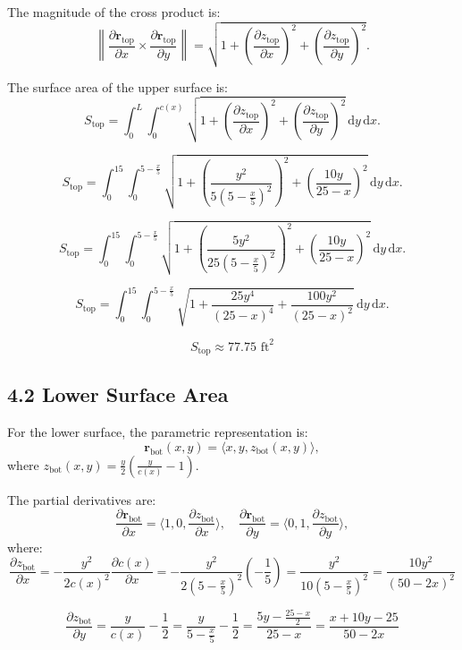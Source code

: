 \documentclass[12pt]{article}
\begin{document}
The magnitude of the cross product is:
\[
\left\| \frac{\partial \mathbf{r}_{\text{top}}}{\partial x} \times \frac{\partial \mathbf{r}_{\text{top}}}{\partial y} \right\| =
\sqrt{1 + \left( \frac{\partial z_{\text{top}}}{\partial x} \right)^2 + \left( \frac{\partial z_{\text{top}}}{\partial y} \right)^2}.
\]

The surface area of the upper surface is:
\[
S_{\text{top}} = \int_{0}^L \int_{0}^{c(x)} \sqrt{1 + \left( \frac{\partial z_{\text{top}}}{\partial x} \right)^2 + \left( \frac{\partial z_{\text{top}}}{\partial y} \right)^2} \, \mathrm{d}y \, \mathrm{d}x.
\]

\[
S_{\text{top}} = \int_{0}^{15} \int_{0}^{5 - \frac{x}{5}} \sqrt{1 + \left( \frac{y^2}{5(5 - \frac{x}{5})^2} \right)^2 + \left( \frac{10y}{25 - x} \right)^2} \, \mathrm{d}y \, \mathrm{d}x.
\]

\[
S_{\text{top}} = \int_{0}^{15} \int_{0}^{5 - \frac{x}{5}} \sqrt{1 + \left( \frac{5y^2}{25(5 - \frac{x}{5})^2} \right)^2 + \left( \frac{10y}{25 - x} \right)^2} \, \mathrm{d}y \, \mathrm{d}x.
\]

\[
S_{\text{top}} = \int_{0}^{15} \int_{0}^{5 - \frac{x}{5}} \sqrt{1 + \frac{25y^4}{(25 - x)^4} +  \frac{100y^2}{(25 - x)^2}} \, \mathrm{d}y \, \mathrm{d}x.
\]

\[S_{\text{top}} \approx 77.75 \text{ ft}^2\]

\subsection*{4.2 Lower Surface Area}

For the lower surface, the parametric representation is:
\[
\mathbf{r}_{\text{bot}}(x, y) = \langle x, y, z_{\text{bot}}(x, y) \rangle,
\]
where \( z_{\text{bot}}(x, y) = \frac{y}{2} \left( \frac{y}{c(x)} - 1 \right) \).

The partial derivatives are:
\[
\frac{\partial \mathbf{r}_{\text{bot}}}{\partial x} = \langle 1, 0, \frac{\partial z_{\text{bot}}}{\partial x} \rangle, \quad
\frac{\partial \mathbf{r}_{\text{bot}}}{\partial y} = \langle 0, 1, \frac{\partial z_{\text{bot}}}{\partial y} \rangle,
\]
where:
\[
\frac{\partial z_{\text{bot}}}{\partial x} = -\frac{y^2}{2c(x)^2} \frac{\partial c(x)}{\partial x} = -\frac{y^2}{2(5 - \frac{x}{5})^2} \left(-\frac{1}{5}\right) = \frac{y^2}{10(5 - \frac{x}{5})^2} = \frac{10y^2}{(50-2x)^2}
\]

\[\frac{\partial z_{\text{bot}}}{\partial y} = \frac{y}{c(x)} - \frac{1}{2} = \frac{y}{5 - \frac{x}{5}} - \frac{1}{2} = \frac{5y - \frac{25 - x}{2}}{25 - x} = \frac{x + 10y - 25}{50 - 2x} \]
\end{document}

